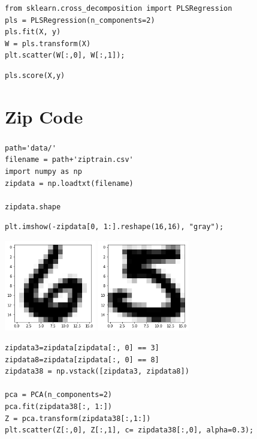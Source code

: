 \begin{frame}[fragile]\frametitle{}
\tiny	
\begin{lstlisting}
from sklearn.cross_decomposition import PLSRegression
pls = PLSRegression(n_components=2)
pls.fit(X, y)
W = pls.transform(X)
plt.scatter(W[:,0], W[:,1]);
\end{lstlisting} 
\pause
\begin{lstlisting}
pls.score(X,y)
\end{lstlisting} 
\end{frame}

\section{Zip Code}



\begin{frame}[fragile]\frametitle{}
\tiny	
\begin{lstlisting}
path='data/'
filename = path+'ziptrain.csv'
import numpy as np
zipdata = np.loadtxt(filename)

zipdata.shape
\end{lstlisting} 

\begin{lstlisting}
plt.imshow(-zipdata[0, 1:].reshape(16,16), "gray");
\end{lstlisting} 

\includegraphics[width=0.3\textwidth]{fig/zip6} \pause
\includegraphics[width=0.3\textwidth]{fig/zip5}\\
\pause

\begin{lstlisting}
zipdata3=zipdata[zipdata[:, 0] == 3]
zipdata8=zipdata[zipdata[:, 0] == 8]
zipdata38 = np.vstack([zipdata3, zipdata8])

pca = PCA(n_components=2)
pca.fit(zipdata38[:, 1:])
Z = pca.transform(zipdata38[:,1:])
plt.scatter(Z[:,0], Z[:,1], c= zipdata38[:,0], alpha=0.3);
\end{lstlisting} 
\end{frame}

